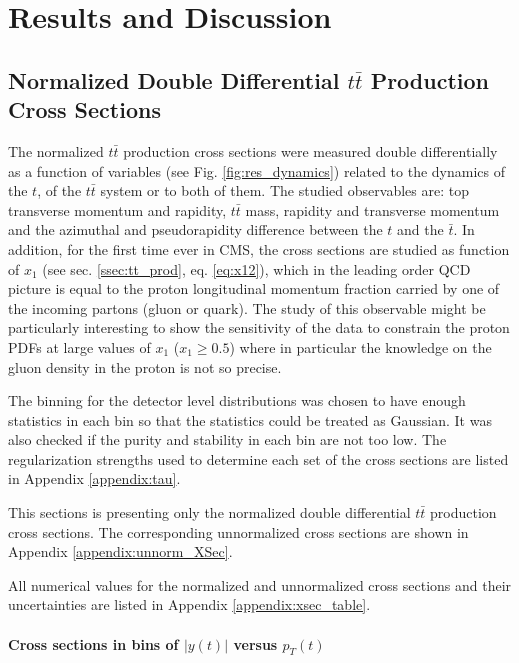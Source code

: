 \chapter{Results and Discussion}\label{chapt:results}

\section{Normalized Double Differential $t\bar{t}$ Production Cross Sections}\label{ssec:xsec_mes}

The normalized $t\bar{t}$ production cross sections were measured double differentially  as a function of variables (see Fig. \ref{fig:res_dynamics})
related to the dynamics of the $t$, of the $t\bar{t}$ system or to both of them. The studied observables are: top transverse momentum and rapidity, 
$t\bar{t}$ mass, rapidity and transverse momentum and the azimuthal and pseudorapidity difference between the $t$ and the $\bar{t}$.
In addition, for the first time ever in CMS, the cross sections are studied as function of $x_{1}$ (see sec. \ref{ssec:tt_prod}, eq. \ref{eq:x12}),
which in the leading order QCD picture is equal to the proton longitudinal momentum fraction carried by one of the incoming partons (gluon or quark).
The study of this observable might be particularly interesting to show the sensitivity of the data to constrain the proton PDFs at large values of 
$x_{1}$ ($x_{1} \geq 0.5$) where in particular the knowledge on the gluon density in the proton is not so precise.

The binning for the detector level distributions was chosen to have enough statistics in each bin so that the statistics could be treated as Gaussian.
It was also checked if the purity and stability in each bin are not too low.
The regularization strengths used to determine each set of the cross sections are listed in Appendix \ref{appendix:tau}.


This sections is presenting only the normalized double differential $t\bar{t}$ production cross sections. The corresponding
unnormalized cross sections are shown in Appendix \ref{appendix:unnorm_XSec}. 

All numerical values for the normalized and unnormalized cross sections
and their uncertainties are listed in Appendix \ref{appendix:xsec_table}.

\subsubsection{Cross sections in bins of $|y(t)|$ versus $p_{T}(t)$}

